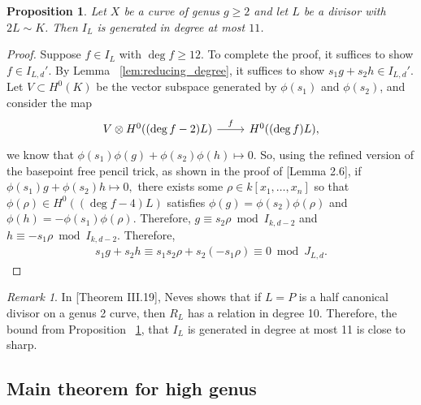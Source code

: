 \documentclass{amsart}
\theoremstyle{plain}
\newtheorem{prop}[thm]{Proposition}
\theoremstyle{definition}
\theoremstyle{remark}
\newtheorem{rem}[thm]{Remark}
\numberwithin{equation}{section}
\newcommand\ssec{\subsection}
\begin{document}
\begin{prop}
\label{prop:relations_generation}
Let $X$ be a curve of genus $g \geq 2$ and let $L$ be a divisor with $2L \sim K$. Then $I_L$ is generated in degree at most $11$.
\end{prop}
\begin{proof}
Suppose $f \in I_L$ with $\deg f \geq 12$. To complete the proof, it suffices to show $f \in I_{L,d}'$. By Lemma ~\ref{lem:reducing_degree}, it suffices to show $s_1g+s_2h \in I_{L,d}'$. 
Let $V \subset H^0(K)$ be the vector subspace generated by $\phi(s_1)$ and $\phi(s_2)$, and consider the map
$$\begin{tikzcd}
V \otimes H^0((\deg f - 2)L) \ar {r}{f} & H^0((\deg f)L),
\end{tikzcd}$$
we know that $\phi(s_1)\phi(g) + \phi(s_2) \phi(h) \mapsto 0.$
So, using the refined version of the basepoint free pencil trick, as shown in the proof of \cite{saint-donat:proj}[Lemma 2.6], if $\phi(s_1) g + \phi(s_2)h \mapsto 0,$ there exists some $\rho \in k[x_1, \ldots, x_n]$ so that $\phi(\rho) \in H^0((\deg f - 4)L)$ satisfies $\phi(g) = \phi(s_2)\phi(\rho)$ and $\phi(h) = -\phi(s_1)\phi(\rho).$ Therefore, $g \equiv s_2 \rho \bmod I_{k,d-2}$ and $h \equiv -s_1 \rho \bmod I_{k,d-2}$. Therefore,
\begin{align*}
	s_1g + s_2h \equiv s_1s_2\rho + s_2(-s_1 \rho) \equiv 0 \bmod J_{L,d}.
\end{align*}
\end{proof}

\begin{rem}
\label{rem:relations_generation_ten}
In \cite{neves:halfcan}[Theorem III.19], Neves shows that if $L=P$ is a half canonical divisor on a genus 2 curve, then $R_L$ has a relation in degree 10. Therefore, the bound from Proposition ~\ref{prop:relations_generation}, that $I_L$ is generated in degree at most 11 is close to sharp.
\end{rem}



\ssec{Main theorem for high genus}











\end{document}
